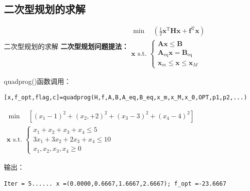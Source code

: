 \documentclass[12pt]{beamer}
\begin{document}
	\subsection{二次型规划的求解}
		\begin{frame}[fragile]{二次型规划的求解}
	\textbf{二次型规划问题提法：}$
\begin{array}{l}
\min \quad \left(\frac{1}{2} \mathbf{x}^{\mathrm{T}} \mathbf{H} \mathbf{x}+\mathbf{f}^{\mathrm{T}} \mathbf{x}\right)\\
\mathbf{x} \text { s.t. }\left\{\begin{array}{l}
\mathbf{A} \mathbf{x} \leqslant \mathbf{B} \\
\mathbf{A}_{\mathrm{eq}} \mathbf{x}=\mathbf{B}_{\mathrm{eq}} \\
\mathbf{x}_{m} \leqslant \mathbf{x} \leqslant \mathbf{x}_{M}
\end{array}\right.
\end{array}$

	\begin{block}{quadprog()函数调用：}
\begin{lstlisting}
[x,f_opt,flag,c]=quadprog(H,f,A,B,A_eq,B_eq,x_m,x_M,x_0,OPT,p1,p2,...)
\end{lstlisting}
	\end{block}	

\begin{example}[6-18]
	$\begin{array}{l}
	\min \quad \left[\left(x_{1}-1\right)^{2}+\left(x_{2},+2\right)^{2}+\left(x_{3}-3\right)^{2}+\left(x_{4}-4\right)^{2}\right]\\
	\mathbf{x} \text { s.t. }\left\{\begin{array}{l}
	x_{1}+x_{2}+x_{3}+x_{4} \leqslant 5 \\
	3 x_{1}+3 x_{2}+2 x_{3}+x_{4} \leq 10 \\
	x_{1}, x_{2}, x_{3}, x_{4} \geqslant 0
	\end{array}\right.
	\end{array}
	$
\end{example}

\begin{block}{输出：}
	\begin{lstlisting}
Iter = 5...... x =(0.0000,0.6667,1.6667,2.6667); f_opt =-23.6667
	\end{lstlisting}
\end{block}	
			
		\end{frame}
\end{document}
